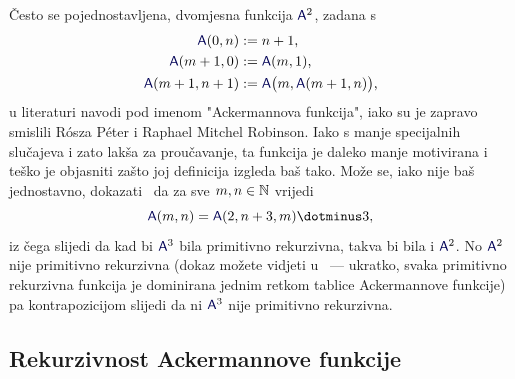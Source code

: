 \begin{napomena}[{name=[dvomjesna Ackermannova funkcija]}]
Često se pojednostavljena, dvomjesna funkcija $\f A^2$, zadana s
\begin{align}
    \f A(0,n)&:=n+1\text,\\
    \f A(m+1,0)&:=\f A(m,1)\text,\\
    \f A(m+1,n+1)&:=\f A\bigl(m,\f A(m+1,n)\bigr)\text,
\end{align}
	u literaturi navodi pod imenom "Ackermannova funkcija", iako su je zapravo smislili R\'osza P\'eter i Raphael Mitchel Robinson. Iako s manje specijalnih slučajeva i zato lakša za proučavanje, ta funkcija je daleko manje motivirana i teško je objasniti zašto joj definicija izgleda baš tako. Može se, iako nije baš jednostavno, dokazati~\cite{Ackermann} da za sve $m,n\in{\mathbb N}$ vrijedi
\begin{equation}
    \f A(m,n)=\f A(2,n+3,m)\dotminus3\text,
\end{equation}
	iz čega slijedi da kad bi $\f A^3$ bila primitivno rekurzivna, takva bi bila i $\f A^2$. No $\f A^2$ nije primitivno rekurzivna (dokaz možete vidjeti u~\cite[dodatak]{skr:Vuk} --- ukratko, svaka primitivno rekurzivna funkcija je dominirana jednim retkom tablice Ackermannove funkcije) pa kontrapozicijom slijedi da ni $\f A^3$ nije primitivno rekurzivna.
\end{napomena}

\subsection{Rekurzivnost Ackermannove funkcije}

